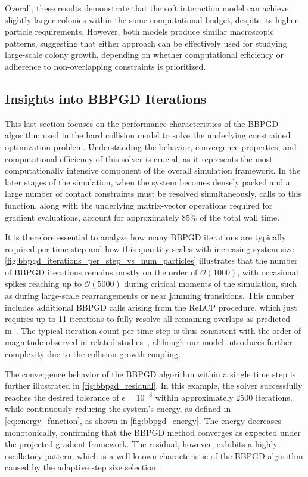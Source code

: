 \documentclass[conference]{IEEEtran}
\begin{document}
Overall, these results demonstrate that the soft interaction model can achieve slightly larger colonies within the same computational budget, despite its higher particle requirements. However, both models produce similar macroscopic patterns, suggesting that either approach can be effectively used for studying large-scale colony growth, depending on whether computational efficiency or adherence to non-overlapping constraints is prioritized.


\subsection{Insights into BBPGD Iterations}


This last section focuses on the performance characteristics of the BBPGD algorithm used in the hard collision model to solve the underlying constrained optimization problem. Understanding the behavior, convergence properties, and computational efficiency of this solver is crucial, as it represents the most computationally intensive component of the overall simulation framework. In the later stages of the simulation, when the system becomes densely packed and a large number of contact constraints must be resolved simultaneously, calls to this function, along with the underlying matrix-vector operations required for gradient evaluations, account for approximately 85\% of the total wall time.

It is therefore essential to analyze how many BBPGD iterations are typically required per time step and how this quantity scales with increasing system size. \autoref{fig:bbpgd_iterations_per_step_vs_num_particles} illustrates that the number of BBPGD iterations remains mostly on the order of $\mathcal{O}(1000)$, with occasional spikes reaching up to $\mathcal{O}(5000)$ during critical moments of the simulation, such as during large-scale rearrangements or near jamming transitions. This number includes additional BBPGD calls arising from the ReLCP procedure, which just requires up to 11 iterations to fully resolve all remaining overlaps as predicted in~\cite{Weady2024SM}. The typical iteration count per time step is thus consistent with the order of magnitude observed in related studies~\cite{Yan2019}, although our model introduces further complexity due to the collision-growth coupling.

The convergence behavior of the BBPGD algorithm within a single time step is further illustrated in \autoref{fig:bbpgd_residual}. In this example, the solver successfully reaches the desired tolerance of $\epsilon = 10^{-3}$ within approximately 2500 iterations, while continuously reducing the system's energy, as defined in \autoref{eq:energy_function}, as shown in \autoref{fig:bbpgd_energy}. The energy decreases monotonically, confirming that the BBPGD method converges as expected under the projected gradient framework. The residual, however, exhibits a highly oscillatory pattern, which is a well-known characteristic of the BBPGD algorithm caused by the adaptive step size selection~\cite{BBPGD,Schneider2021}.
\end{document}
